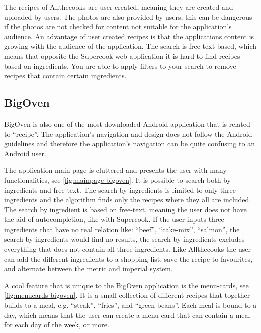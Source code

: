 The recipes of Allthecooks are user created, meaning they are created and uploaded by users. The photos are also provided by users, this can be dangerous if the photos are not checked for content not suitable for the application's audience. An advantage of user created recipes is that the applications content is growing with the audience of the application.
The search is free-text based, which means that opposite the Supercook web application it is hard to find recipes based on ingredients. You are able to apply filters to your search to remove recipes that contain certain ingredients.

\subsection{BigOven}
BigOven is also one of the most downloaded \cite{bigoven-googleplay} Android application that is related to ``recipe''. The application's navigation and design does not follow the Android guidelines\cite{guidelines-appstructure} and therefore the application's navigation can be quite confusing to an Android user.

The application main page is cluttered and presents the user with many functionalities, see \autoref{fig:mainpage-bigoven}. It is possible to search both by ingredients and free-text. The search by ingredients is limited to only three ingredients and the algorithm finds only the recipes where they all are included. The search by ingredient is based on free-text, meaning the user does not have the aid of autocompletion, like with Supercook. If the user inputs three ingredients that have no real relation like: ``beef'', ``cake-mix'', ``salmon'', the search by ingredients would find no results, the search by ingredients excludes everything that does not contain all three ingredients. Like Allthecooks the user can add the different ingredients to a shopping list, save the recipe to favourites, and alternate between the metric and imperial system.

A cool feature that is unique to the BigOven application is the menu-cards, see \autoref{fig:menucards-bigoven}.
It is a small collection of different recipes that together builds to a meal, e.g. ``steak'', ``fries'', and ``green beans''. Each meal is bound to a day, which means that the user can create a menu-card that can contain a meal for each day of the week, or more. 

